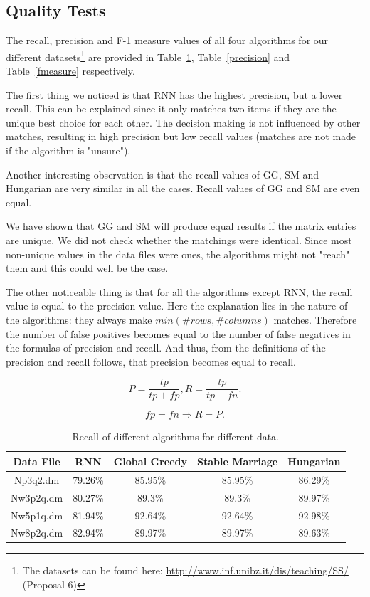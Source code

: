 \documentclass[a4paper,11pt]{article}
\begin{document}
\subsection{Quality Tests}

The recall, precision and F-1 measure values of all four algorithms for our different datasets\footnote{The datasets can be found here: \url{http://www.inf.unibz.it/dis/teaching/SS/} (Proposal 6)} are provided in Table~\ref{recall}, Table~\ref{precision} and Table~\ref{fmeasure} respectively. 

The first thing we noticed is that RNN has the highest precision, but a lower recall. This can be explained since it only matches two items if they are the unique best choice for each other. The decision making is not influenced by other matches, resulting in high precision but low recall values (matches are not made if the algorithm is "unsure").

Another interesting observation is that the recall values of GG, SM and Hungarian are very similar in all the cases. Recall values of GG and SM are even equal. %

We have shown that GG and SM will produce equal results if the matrix entries are unique. We did not check whether the matchings were identical. Since most non-unique values in the data files were ones, the algorithms might not "reach" them and this could well be the case.

The other noticeable thing is that for all the algorithms except RNN, the recall value is equal to the precision value. Here the explanation lies in the nature of the algorithms: they always make $min(\#rows, \#columns)$ matches. Therefore the number of false positives becomes equal to the number of false negatives in the formulas of precision and recall. And thus, from the definitions of the precision and recall follows, that precision becomes equal to recall.


\[P = \frac{tp}{tp+fp}, R = \frac{tp}{tp+fn}.\]

\[fp=fn \Rightarrow R=P.\]

\begin{table}[tbh]
\centering
\begin{tabular}{|c|c|c|c|c|}
\hline 
Data File & RNN & Global Greedy & Stable Marriage & Hungarian \tabularnewline
\hline 
\hline 
 Np3q2.dm & 79.26\% & 85.95\% & 85.95\% & 86.29\%\tabularnewline
\hline
 Nw3p2q.dm & 80.27\% & 89.3\% & 89.3\% & 89.97\%\tabularnewline
\hline 
 Nw5p1q.dm & 81.94\% & 92.64\% & 92.64\% & 92.98\%\tabularnewline
\hline 
 Nw8p2q.dm & 82.94\% & 89.97\% & 89.97\% & 89.63\%\tabularnewline
\hline
\end{tabular}
\caption{Recall of different algorithms for different data.}
\label{recall}
\end{table}
\end{document}
